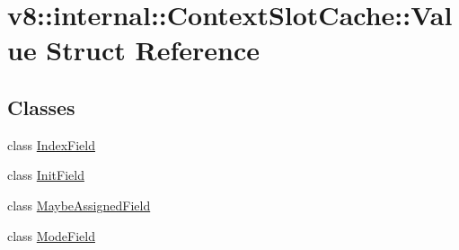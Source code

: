 \hypertarget{structv8_1_1internal_1_1_context_slot_cache_1_1_value}{}\section{v8\+:\+:internal\+:\+:Context\+Slot\+Cache\+:\+:Value Struct Reference}
\label{structv8_1_1internal_1_1_context_slot_cache_1_1_value}
\subsection*{Classes}
\begin{DoxyCompactItemize}
\item 
class \hyperlink{classv8_1_1internal_1_1_context_slot_cache_1_1_value_1_1_index_field}{Index\+Field}
\item 
class \hyperlink{classv8_1_1internal_1_1_context_slot_cache_1_1_value_1_1_init_field}{Init\+Field}
\item 
class \hyperlink{classv8_1_1internal_1_1_context_slot_cache_1_1_value_1_1_maybe_assigned_field}{Maybe\+Assigned\+Field}
\item 
class \hyperlink{classv8_1_1internal_1_1_context_slot_cache_1_1_value_1_1_mode_field}{Mode\+Field}
\end{DoxyCompactItemize}
